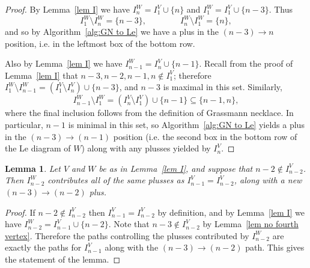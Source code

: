 \documentclass[11pt]{article}
\newtheorem{lem}[thm]{Lemma}
\theoremstyle{remark}
\theoremstyle{definition}
\begin{document}
\begin{proof}
By Lemma~\ref{lem I} we have $I_n^{W}= I_1^{V} \cup \{n\}$ and $I_1^{W} = I_1^{V} \cup \{n-3\}$. Thus 
\[I_1^{W} \setminus I_n^{W} = \{n-3\}, \qquad \qquad I_n^{W} \setminus I_1^{W} = \{n\},\]
and so by Algorithm~\ref{alg:GN to Le} we have a plus in the $(n-3) \rightarrow n$ position, i.e. in the leftmost box of the bottom row. 

Also by Lemma~\ref{lem I} we have $I_{n-1}^{W} = I_n^{V} \cup \{n-1\}$. Recall from the proof of Lemma~\ref{lem I} that $n-3,n-2,n-1,n \not\in I_1^V$; therefore $I_1^W\setminus I_{n-1}^W = (I_1^V \setminus I_n^V) \cup\{n-3\}$, and $n-3$ is maximal in this set. Similarly, 
\[I_{n-1}^W \setminus I_1^W = (I_n^V \setminus I_1^V) \cup \{n-1\} \subseteq \{n-1,n\},\]
where the final inclusion follows from the definition of Grassmann necklace. In particular, $n-1$ is minimal in this set, so Algorithm~\ref{alg:GN to Le} yields a plus in the $(n-3) \rightarrow (n-1)$ position (i.e. the second box in the bottom row of the Le diagram of $W$) along with any plusses yielded by $I_n^V$.
\end{proof} 



\begin{lem}\label{lem n-2 good}
  Let $V$ and $W$ be as in Lemma~\ref{lem I}, and suppose that $n-2 \not\in I_{n-2}^{V}$. Then $I_{n-2}^{W}$ contributes all of the same plusses as $I_{n-1}^{V}=I_{n-2}^{V}$, along with a new $(n-3)\rightarrow (n-2)$ plus.
\end{lem}

\begin{proof}
If $n-2\not\in I_{n-2}^{V}$ then $I_{n-1}^{V}=I_{n-2}^{V}$ by definition, and by Lemma~\ref{lem I} we have $I_{n-2}^{W} = I_{n-1}^{V} \cup \{n-2\}$.  Note that $n-3\not\in I_{n-2}^{V}$ by Lemma~\ref{lem no fourth vertex}.  Therefore the paths controlling the plusses contributed by $I_{n-2}^{W}$ are exactly the paths for $I_{n-1}^{V}$ along with the $(n-3)\rightarrow (n-2)$ path.  This gives the statement of the lemma.
\end{proof}
\end{document}
